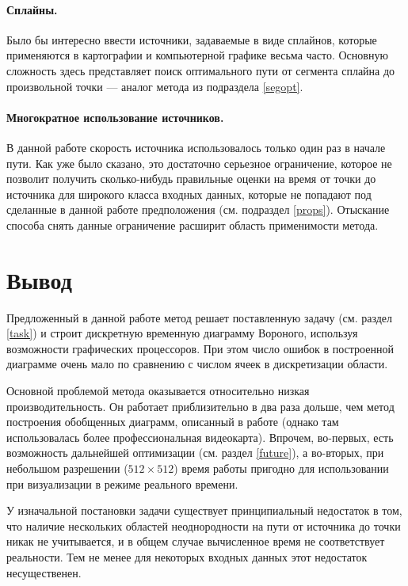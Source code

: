 \documentclass[12pt]{article}
\begin{document}
\paragraph{Сплайны.} Было бы интересно ввести источники, задаваемые в виде сплайнов,
которые применяются в картографии и компьютерной графике весьма часто. 
Основную сложность здесь представляет поиск оптимального пути от сегмента 
сплайна до произвольной точки --- аналог метода из подраздела \ref{segopt}.

\paragraph{Многократное использование источников.} В данной работе скорость
источника использовалось только один раз в начале пути.
Как уже было сказано, это достаточно серьезное ограничение, которое не позволит 
получить сколько-нибудь правильные оценки на время от точки до источника
для широкого класса входных данных, которые не попадают под 
сделанные в данной работе предположения (см. подраздел \ref{props}). Отыскание способа
снять данные ограничение расширит область применимости метода.

\section{Вывод}
Предложенный в данной работе метод решает поставленную задачу (см. раздел \ref{task})
и строит дискретную временную диаграмму Вороного, используя возможности графических
процессоров. При этом число ошибок в построенной диаграмме очень мало по 
сравнению с числом ячеек в дискретизации области. 

Основной проблемой метода оказывается относительно низкая производительность. 
Он работает приблизительно в два раза дольше, чем метод построения обобщенных диаграмм, 
описанный в работе \cite{gvd} (однако там использовалась более профессиональная видеокарта). 
Впрочем, во-первых, есть возможность дальнейшей оптимизации
(см. раздел \ref{future}), а во-вторых, при небольшом разрешении ($512\times512$)
время работы пригодно для использовании при визуализации в режиме
реального времени.

У изначальной постановки задачи существует принципиальный недостаток в том, 
что наличие нескольких областей неоднородности на пути от источника до точки
никак не учитывается, и в общем случае вычисленное время не соответствует 
реальности. Тем не менее для некоторых входных данных этот недостаток несущественен.
\end{document}
